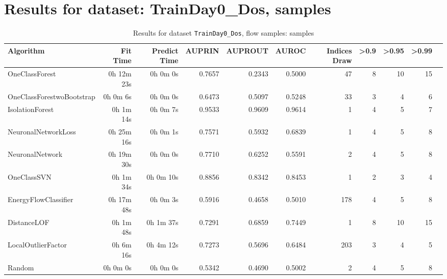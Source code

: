\documentclass{article}
\begin{document}
\section*{Results for dataset: TrainDay0_Dos, samples}
\begin{table}[h!]
\centering
\caption{Results for dataset \texttt{TrainDay0_Dos}, flow samples: samples}
\label{tab:trainday0dos_samples}
\begin{tabular}{lrrrrrrrrrr}
\toprule
Algorithm & Fit Time & Predict Time & AUPRIN & AUPROUT & AUROC & Indices Draw & >0.9 & >0.95 & >0.99 \\
\midrule
OneClassForest & 0h 12m 23s & 0h 0m 0s & 0.7657 & 0.2343 & 0.5000 & 47 & 8 & 10 & 15 \\
OneClassForestwoBootstrap & 0h 0m 6s & 0h 0m 0s & 0.6473 & 0.5097 & 0.5248 & 33 & 3 & 4 & 6 \\
IsolationForest & 0h 1m 14s & 0h 0m 7s & 0.9533 & 0.9609 & 0.9614 & 1 & 4 & 5 & 7 \\
NeuronalNetworkLoss & 0h 25m 16s & 0h 0m 1s & 0.7571 & 0.5932 & 0.6839 & 1 & 4 & 5 & 8 \\
NeuronalNetwork & 0h 19m 30s & 0h 0m 0s & 0.7710 & 0.6252 & 0.5591 & 2 & 4 & 5 & 8 \\
OneClassSVN & 0h 1m 34s & 0h 0m 10s & 0.8856 & 0.8342 & 0.8453 & 1 & 2 & 3 & 4 \\
EnergyFlowClassifier & 0h 17m 48s & 0h 0m 3s & 0.5916 & 0.4658 & 0.5010 & 178 & 4 & 5 & 8 \\
DistanceLOF & 0h 1m 48s & 0h 1m 37s & 0.7291 & 0.6859 & 0.7449 & 1 & 8 & 10 & 15 \\
LocalOutlierFactor & 0h 6m 16s & 0h 4m 12s & 0.7273 & 0.5696 & 0.6484 & 203 & 3 & 4 & 5 \\
Random & 0h 0m 0s & 0h 0m 0s & 0.5342 & 0.4690 & 0.5002 & 2 & 4 & 5 & 8 \\
\bottomrule
\end{tabular}
\end{table}
\end{document}
